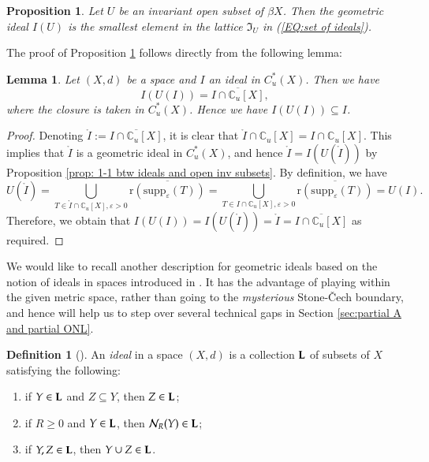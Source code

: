 \documentclass[12pt, a4paper]{amsart}
\numberwithin{equation}{section}
\newtheorem{lem}[thm]{Lemma}
\newtheorem{prop}[thm]{Proposition}
\theoremstyle{definition}
\newtheorem{defn}[thm]{Definition}
\theoremstyle{remark}
\def\CC{\mathbb{C}}
\def\L{\mathcal{L}}
\def\Nd{\mathcal{N}}
\def\supp{\mathrm{supp}}
\def\r{\mathrm{r}}
\def\L{{\bf L}}
\begin{document}
\begin{prop}\label{cor: geometric ideals are smallest}
Let $U$ be an invariant open subset of $\beta X$.
Then the geometric ideal $I(U)$ is the smallest element in the lattice $\mathfrak{I}_U$ in (\ref{EQ:set of ideals}).
\end{prop}

The proof of Proposition \ref{cor: geometric ideals are smallest} follows directly from the following lemma:


\begin{lem}\label{prop: geometric ideals are smallest}
Let $(X,d)$ be a space and $I$ an ideal in $C^*_u(X)$. Then we have 
\[
I(U(I)) = \overline{I \cap \CC_u[X]},
\]
where the closure is taken in $C^*_u(X)$. Hence we have $I(U(I)) \subseteq I$.
\end{lem}

\begin{proof}
Denoting $\mathring{I}:=\overline{I \cap \CC_u[X]}$, it is clear that $\mathring{I} \cap \CC_u[X] = I \cap \CC_u[X]$. This implies that $\mathring{I}$ is a geometric ideal in $C^*_u(X)$, and hence $\mathring{I} = I(U(\mathring{I}))$ by Proposition \ref{prop: 1-1 btw ideals and open inv subsets}. By definition, we have
\[
U(\mathring{I}) =  \bigcup_{T \in \mathring{I} \cap \CC_u[X], \varepsilon >0} \overline{\r(\supp_\varepsilon(T))} = \bigcup_{T \in I \cap \CC_u[X], \varepsilon >0} \overline{\r(\supp_\varepsilon(T))} = U(I).
\]
Therefore, we obtain that $I(U(I)) = I(U(\mathring{I})) = \mathring{I}=\overline{I \cap \CC_u[X]}$ as required.
\end{proof}






We would like to recall another description for geometric ideals based on the notion of ideals in spaces introduced in \cite{CW04}. It has the advantage of playing within the given metric space, rather than going to the \emph{mysterious} Stone-\v{C}ech boundary, and hence will help us to step over several technical gaps in Section \ref{sec:partial A and partial ONL}.


\begin{defn}[{\cite[Definition 6.1]{CW04}}]\label{defn: ideals in space}
An \emph{ideal} in a space $(X,d)$ is a collection $\L$ of subsets of $X$ satisfying the following:
\begin{enumerate}
 \item if $Y \in \L$ and $Z \subseteq Y$, then $Z \in \L$;
 \item if $R\geq 0$ and $Y \in \L$, then $\Nd_R(Y) \in \L$;
 \item if $Y,Z \in \L$, then $Y \cup Z \in \L$.
\end{enumerate}
\end{defn}
\end{document}
